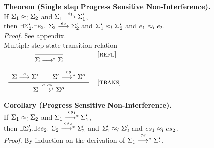 \textbf{Theorem (Single step Progress Sensitive Non-Interference).}
\\
If $\lequiv{l}{\Sigma_1}{\Sigma_2}$
and $\sstep{e_1}{\Sigma_1}{\Sigma_1'}$,
\\
then $\exists \Sigma_2'.\exists e_2.~\sstep{e_2}{\Sigma_2}{\Sigma_2'}$
and $\lequiv{l}{\Sigma_1'}{\Sigma_2'}$
and $\lequiv{l}{e_1}{e_2}$.
\\
\textit{Proof.}
See appendix.
\\
 Multiple-step state transition relation
\\
$\startrules
  \mrule{refl}{
  }{
    \sstepstar{}{\Sigma}{\Sigma}
  }
  \mrule{trans}{
      \sstep{e}{\Sigma}{\Sigma'}
    \qquad
      \sstepstar{es}{\Sigma'}{\Sigma''}
  }{
    \sstepstar{e~es}{\Sigma}{\Sigma''}
  }
\finishrules$
\\
\textbf{Corollary (Progress Sensitive Non-Interference).}
\\
If $\lequiv{l}{\Sigma_1}{\Sigma_2}$
and $\sstepstar{es_1}{\Sigma_1}{\Sigma_1'}$,
\\
then $\exists \Sigma_2'.\exists es_2.~\sstepstar{es_2}{\Sigma_2}{\Sigma_2'}$
and $\lequiv{l}{\Sigma_1'}{\Sigma_2'}$
and $\lequiv{l}{es_1}{es_2}$.
\\
\textit{Proof.}
By induction on the derivation of $\sstepstar{es_1}{\Sigma_1}{\Sigma_1'}$.
